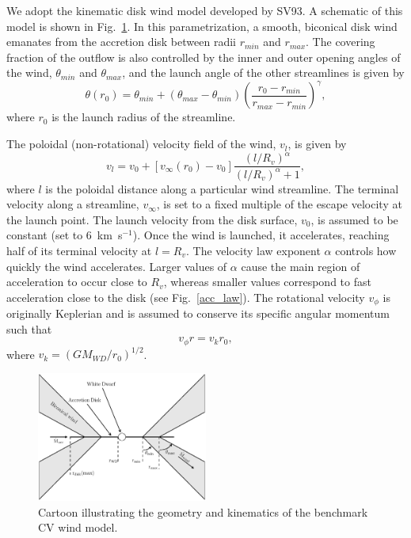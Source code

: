 \documentclass[preprint, a4paper, 11pt]{aastex}
\begin{document}
We adopt the kinematic disk wind model developed by SV93. 
A schematic of this model is shown in
Fig.~\ref{cartoon}. In this parametrization, a smooth, biconical
disk wind emanates from the accretion disk between radii $r_{min}$ and 
$r_{max}$. The covering fraction of the outflow is also controlled by the
inner and outer opening angles of the wind, $\theta_{min}$ and
$\theta_{max}$, and the launch angle of the other streamlines is given
by 
\begin{equation}
\theta(r_0) = \theta_{min} + (\theta_{max} - \theta_{min}) \left(\frac{r_0 - r_{min}}{r_{max} - r_{min}} \right)^{\gamma},
\label{theta}
\end{equation}
where $r_0$ is the launch radius of the streamline.

The poloidal (non-rotational) velocity field of the wind, $v_l$, is given by
\begin{equation}
v_l=v_0+\left[v_{\infty}(r_0)-v_0\right]\frac{\left(l/R_v\right)^{\alpha}}{\left(l/R_v\right)^{\alpha}+1},
\label{v_law}
\end{equation}
where $l$ is the poloidal distance along a particular wind
streamline. The terminal velocity along a streamline, $v_{\infty}$, is
set to a fixed multiple of the escape velocity at the launch
point. The launch velocity from the disk surface, $v_0$, is assumed to
be constant (set to $6$~km~s$^{-1}$). Once the wind is launched, it
accelerates, reaching half of its terminal velocity at $l = R_v$. The
velocity law exponent $\alpha$ controls how quickly the wind
accelerates. Larger values of $\alpha$ cause the main region of 
acceleration to occur close to $R_v$, whereas smaller values
correspond to fast acceleration close to the disk (see
Fig.~\ref{acc_law}). The rotational velocity $v_\phi$ is originally 
Keplerian and is assumed to conserve its specific angular momentum
such that
\begin{equation}
v_\phi r = v_{k} r_0,
\label{v_law}
\end{equation}
where $v_{k}=(GM_{WD}/r_0)^{1/2}$.


\begin{figure} 
\centering
\includegraphics[width=0.5\textwidth]{figures/fig2_cartoon.eps}
\caption{Cartoon illustrating the geometry and kinematics of the benchmark CV wind model.}
\label{cartoon}
\end{figure} 
\end{document}
